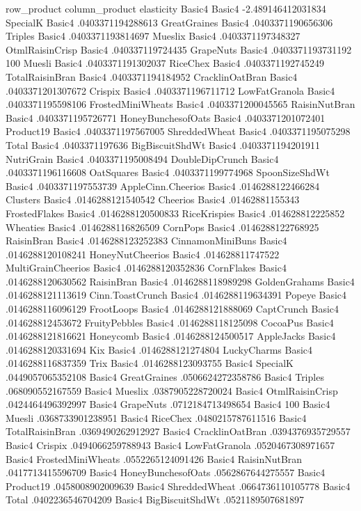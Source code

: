 row_product	column_product	elasticity
Basic4	Basic4	-2.489146412031834
SpecialK	Basic4	.0403371194288613
GreatGraines	Basic4	.0403371190656306
Triples	Basic4	.0403371193814697
Mueslix	Basic4	.0403371197348327
OtmlRaisinCrisp	Basic4	.040337119724435
GrapeNuts	Basic4	.0403371193731192
100%
Muesli	Basic4	.0403371191302037
RiceChex	Basic4	.0403371192745249
TotalRaisinBran	Basic4	.0403371194184952
CracklinOatBran	Basic4	.0403371201307672
Crispix	Basic4	.0403371196711712
LowFatGranola	Basic4	.0403371195598106
FrostedMiniWheats	Basic4	.0403371200045565
RaisinNutBran	Basic4	.0403371195726771
HoneyBunchesofOats	Basic4	.0403371201072401
Product19	Basic4	.0403371197567005
ShreddedWheat	Basic4	.0403371195075298
Total	Basic4	.0403371197636
BigBiscuitShdWt	Basic4	.0403371194201911
NutriGrain	Basic4	.0403371195008494
DoubleDipCrunch	Basic4	.0403371196116608
OatSquares	Basic4	.0403371199774968
SpoonSizeShdWt	Basic4	.0403371197553739
AppleCinn.Cheerios	Basic4	.0146288122466284
Clusters	Basic4	.0146288121540542
Cheerios	Basic4	.01462881155343
FrostedFlakes	Basic4	.0146288120500833
RiceKrispies	Basic4	.014628812225852
Wheaties	Basic4	.0146288116826509
CornPops	Basic4	.0146288122768925
RaisinBran	Basic4	.0146288123252383
CinnamonMiniBuns	Basic4	.0146288120108241
HoneyNutCheerios	Basic4	.014628811747522
MultiGrainCheerios	Basic4	.0146288120352836
CornFlakes	Basic4	.0146288120630562
RaisinBran	Basic4	.0146288118989298
GoldenGrahams	Basic4	.0146288121113619
Cinn.ToastCrunch	Basic4	.0146288119634391
Popeye	Basic4	.0146288116096129
FrootLoops	Basic4	.0146288121888069
CaptCrunch	Basic4	.014628812453672
FruityPebbles	Basic4	.0146288118125098
CocoaPus	Basic4	.0146288121816621
Honeycomb	Basic4	.0146288124500517
AppleJacks	Basic4	.0146288120331694
Kix	Basic4	.0146288121274804
LuckyCharms	Basic4	.0146288116837359
Trix	Basic4	.0146288123093755
Basic4	SpecialK	.0449057065352108
Basic4	GreatGraines	.0506624272358786
Basic4	Triples	.068090552167559
Basic4	Mueslix	.0387905228720024
Basic4	OtmlRaisinCrisp	.0424464496392997
Basic4	GrapeNuts	.0712184713498654
Basic4	100%
Basic4	Muesli	.0368733901238951
Basic4	RiceChex	.0480215787611516
Basic4	TotalRaisinBran	.0369490262912927
Basic4	CracklinOatBran	.0394376935729557
Basic4	Crispix	.0494066259788943
Basic4	LowFatGranola	.0520467308971657
Basic4	FrostedMiniWheats	.0552265124091426
Basic4	RaisinNutBran	.0417713415596709
Basic4	HoneyBunchesofOats	.0562867644275557
Basic4	Product19	.0458008902009639
Basic4	ShreddedWheat	.0664736110105778
Basic4	Total	.0402236546704209
Basic4	BigBiscuitShdWt	.0521189507681897
